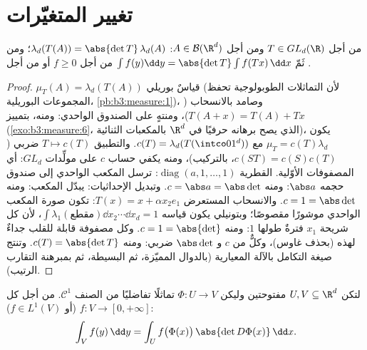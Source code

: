 \section{تغيير المتغيّرات}

\begin{theorem}
\label{thm:b3:product:linearchange}
من أجل $T \in GL_d(\R)$ ومن أجل $A \in \mathcal B(\R^d)$: $\lambda_d(T(A)) = \abs{\det T}\,\lambda_d(A)$؛ ومن ثَمّ $\int f(y)\dd y = \abs{\det T}\int f(Tx)\,\dd x$
من أجل $f \geq 0$ أو من أجل .
\end{theorem}

\begin{proof}
 $\mu_T(A) = \lambda_d(T(A))$ قياسٌ بوريلي (لأن التماثلات الطوبولوجية تحفظ
المجموعات البوريلية، \cref{pb:b3:measure:1})، وصامد بالانسحاب ($T(A + x) = T(A) + Tx$)،
ومنتهٍ على الصندوق الواحدي: ومنه، بتمييز 
(\cref{exo:b3:measure:6}، الذي يصح برهانه حرفيًا في $\R^d$ بالمكعبات
الثنائية)، يكون $\mu_T = c(T)\lambda_d$ مع $c(T)
= \lambda_d(T(\intco01^d))$. والتطبيق $T \mapsto c(T)$
ضربي ($c(ST) = c(S)c(T)$، بالتركيب)، ومنه يكفي حساب $c$ على مولِّدات
$GL_d$: أي المصفوفات الأوّلية. القطرية $\operatorname{diag}(a, 1, \dots, 1)$: ترسل المكعب
الواحدي إلى صندوق حجمه $\abs a$: ومنه $c = \abs a =
\abs\det$. وتبديل
الإحداثيات: يبدّل المكعب: ومنه $c
= 1 = \abs\det$. والانسحاب المستعرض
$T(x) = x + \alpha
x_2e_1$: تكون صورة المكعب الواحدي موشورًا مقصوصًا؛ وبتونيلي
يكون قياسه $\int\lambda_1(\text{مقطع})\dd x_2
\cdots \dd x_d = 1$، لأن كل شريحة $x_1$ فترةٌ طولها $1$: ومنه
$c = 1 = \abs{\det}$. وكل مصفوفة قابلة للقلب جداءٌ لهذه (بحذف غاوس)، وكلٌّ
من $c$ و $\abs\det$ ضربي: ومنه $c(T) = \abs{\det T}$. وتنتج صيغة التكامل
بالآلة المعيارية (بالدوال المميّزة، ثم البسيطة، ثم بمبرهنة
التقارب الرتيب).
\end{proof}

\begin{theorem}\label{thm:b3:product:changeofvar}
لتكن $U, V \subseteq \R^d$ مفتوحتين وليكن $\Phi \colon U \to V$ تماثلًا تفاضليًا من الصنف
$\mathcal C^1$. من أجل كل  $f \colon V
\to [0, +\infty]$ (أو
$f \in L^1(V)$):
\[
\int_V f(y)\,\dd y = \int_U
f\bigl(\Phi(x)\bigr)\,\abs{\det D\Phi(x)}\,\dd x .
\]
\end{theorem}

